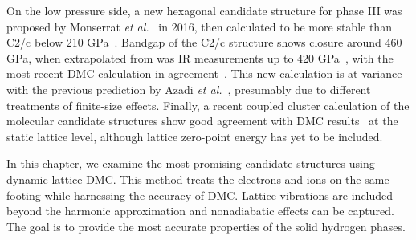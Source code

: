 On the low pressure side, a new hexagonal candidate structure for phase III was proposed by Monserrat \textit{et al.}~\cite{Monserrat2016} in 2016, then calculated to be more stable than C2/c below 210 GPa~\cite{Azadi2019}.
Bandgap of the C2/c structure shows closure around 460 GPa, when extrapolated from  was IR measurements up to 420 GPa~\cite{Loubeyre2020}, with the most recent DMC calculation in agreement~\cite{Gorelov2019}. This new calculation is at variance with the previous prediction by Azadi \textit{et al.}~\cite{Azadi2019}, presumably due to different treatments of finite-size effects.
Finally, a recent coupled cluster calculation of the molecular candidate structures show good agreement with DMC results~\cite{Liao2019} at the static lattice level, although lattice zero-point energy has yet to be included.

In this chapter, we examine the most promising candidate structures using dynamic-lattice DMC.
This method treats the electrons and ions on the same footing while harnessing the accuracy of DMC.
Lattice vibrations are included beyond the harmonic approximation and nonadiabatic effects can be captured.
The goal is to provide the most accurate properties of the solid hydrogen phases.

